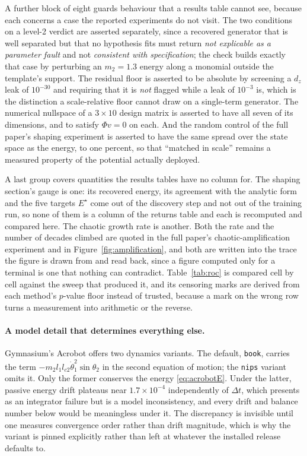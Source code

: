 \documentclass{article}
\begin{document}
A further block of eight guards behaviour that a results table cannot see,
because each concerns a case the reported experiments do not visit. The two
conditions on a level-2 verdict are asserted separately, since a recovered
generator that is well separated but that no hypothesis fits must return
\emph{not explicable as a parameter fault} and not \emph{consistent with
specification}; the check builds exactly that case by perturbing an $m_2 = 1.3$
energy along a monomial outside the template's support. The residual floor is
asserted to be absolute by screening a $d_z$ leak of $10^{-30}$ and requiring
that it is \emph{not} flagged while a leak of $10^{-3}$ is, which is the
distinction a scale-relative floor cannot draw on a single-term generator.
The numerical nullspace of a $3 \times 10$ design matrix is asserted to have all
seven of its dimensions, and to satisfy $\Phi v = 0$ on each. And the random
control of the full paper's shaping experiment is asserted to have the same spread over the
state space as the energy, to one percent, so that ``matched in scale'' remains
a measured property of the potential actually deployed.

A last group covers quantities the results tables have no column for. The
shaping section's gauge is one: its recovered energy, its agreement with the
analytic form and the five targets $E^\star$ come out of the discovery step and
not out of the training run, so none of them is a column of the returns table
and each is recomputed and compared here. The chaotic growth rate is another.
Both the rate and the number of decades climbed are quoted in
the full paper's chaotic-amplification experiment and in Figure~\ref{fig:amplification}, and both are written
into the trace the figure is drawn from and read back, since a figure computed
only for a terminal is one that nothing can contradict. Table~\ref{tab:roc} is
compared cell by cell against the sweep that produced it, and its censoring
marks are derived from each method's $p$-value floor instead of trusted,
because a mark on the wrong row turns a measurement into arithmetic or the
reverse.

\paragraph{A model detail that determines everything else.} Gymnasium's Acrobot
offers two dynamics variants. The default, \texttt{book}, carries the term
$-m_2 l_1 l_{c2}\dot\theta_1^2\sin\theta_2$ in the second equation of motion;
the \texttt{nips} variant omits it. Only the former conserves the energy
\eqref{eq:acrobotE}. Under the latter, passive energy drift plateaus near
$1.7\times10^{-4}$ independently of $\Delta t$, which presents as an integrator
failure but is a model inconsistency, and every drift and balance number below
would be meaningless under it. The discrepancy is invisible until one measures
convergence order rather than drift magnitude, which is why the variant is
pinned explicitly rather than left at whatever the installed release defaults
to.
\end{document}
